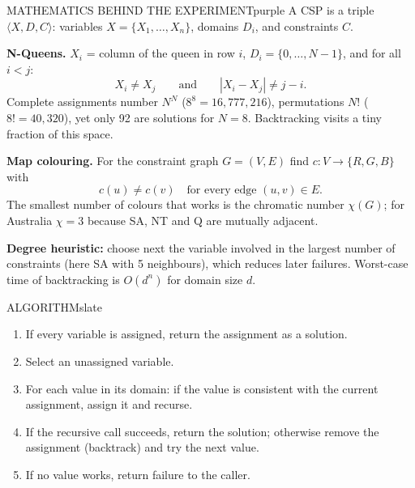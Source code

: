 \documentclass[11pt,a4paper]{article}
\newenvironment{maths}{\begin{secbox}{MATHEMATICS BEHIND THE EXPERIMENT}{purple}}{\end{secbox}}
\newenvironment{algorithm}{\begin{secbox}{ALGORITHM}{slate}}{\end{secbox}}
\begin{document}
\begin{maths}
A CSP is a triple $\langle X, D, C\rangle$: variables $X=\{X_1,\dots,X_n\}$, domains $D_i$, and constraints $C$.

\textbf{N-Queens.} $X_i$ = column of the queen in row $i$, $D_i=\{0,\dots,N-1\}$, and for all $i<j$:
\[ X_i \ne X_j \qquad\text{and}\qquad |X_i - X_j| \ne j-i . \]
Complete assignments number $N^{N}$ ($8^{8}=16{,}777{,}216$), permutations $N!$ ($8! = 40{,}320$), yet only 92 are solutions for $N=8$. Backtracking visits a tiny fraction of this space.

\textbf{Map colouring.} For the constraint graph $G=(V,E)$ find $c: V\to\{R,G,B\}$ with
\[ c(u)\ne c(v)\quad \text{for every edge } (u,v)\in E . \]
The smallest number of colours that works is the chromatic number $\chi(G)$; for Australia $\chi=3$ because SA, NT and Q are mutually adjacent.

\textbf{Degree heuristic:} choose next the variable involved in the largest number of constraints (here SA with 5 neighbours), which reduces later failures. Worst-case time of backtracking is $O(d^{n})$ for domain size $d$.
\end{maths}

\begin{algorithm}
\begin{enumerate}
  \item If every variable is assigned, return the assignment as a solution.
  \item Select an unassigned variable.
  \item For each value in its domain: if the value is consistent with the current assignment, assign it and recurse.
  \item If the recursive call succeeds, return the solution; otherwise remove the assignment (backtrack) and try the next value.
  \item If no value works, return failure to the caller.
\end{enumerate}
\end{algorithm}
\end{document}
